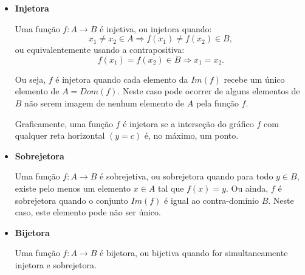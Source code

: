 \begin{itemize}
 \item \textbf{Injetora}

 Uma função $f: A \rightarrow B$ é injetiva, ou injetora quando:
\begin{equation*}
 x_1 \neq x_2 \in A \Rightarrow f(x_1) \neq f(x_2) \in B ,
\end{equation*}
 ou equivalentemente usando a contrapositiva:
\begin{equation*}
f(x_1) = f(x_2) \in B \Rightarrow x_1 = x_2 .
\end{equation*}

 Ou seja, $f$ é injetora quando cada elemento da $Im(f)$ recebe um único elemento de $A= Dom(f)$. Neste caso pode ocorrer de alguns elementos de $B$ não serem imagem de nenhum elemento de $A$ pela função $f$.

\begin{obs}
    Graficamente, uma função $f$ é injetora se a interseção do gráfico $f$ com qualquer reta horizontal $(y=c)$ é, no máximo, um ponto.
\end{obs}

 \item \textbf{Sobrejetora}

 Uma função $f: A \rightarrow B$ é sobrejetiva, ou sobrejetora quando para todo $y \in B$, existe pelo menos um elemento $x \in A$ tal que $f(x) = y$.
 Ou ainda, $f$ é sobrejetora quando o conjunto $Im(f)$ é igual ao contra-domínio $B$. Neste caso, este elemento pode não ser único.

 \item \textbf{Bijetora}

 Uma função $f: A \rightarrow B$ é bijetora, ou bijetiva quando for simultaneamente injetora e sobrejetora.

\end{itemize}

